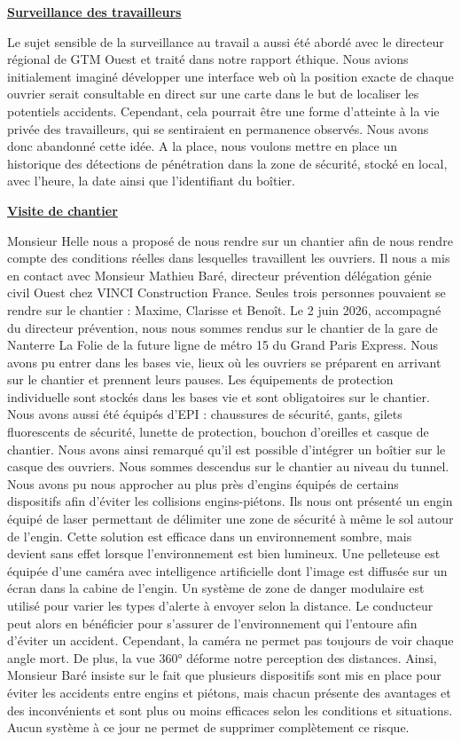 \bigskip

\uline{\textbf{Surveillance des travailleurs}}

Le sujet sensible de la surveillance au travail a aussi été abordé avec le directeur régional de GTM Ouest et traité dans notre rapport éthique. Nous avions initialement imaginé développer une interface web où la position exacte de chaque ouvrier serait consultable en direct sur une carte dans le but de localiser les potentiels accidents. Cependant, cela pourrait être une forme d'atteinte à la vie privée des travailleurs, qui se sentiraient en permanence observés. Nous avons donc abandonné cette idée. A la place, nous voulons mettre en place un historique des détections de pénétration dans la zone de sécurité, stocké en local, avec l'heure, la date ainsi que l'identifiant du boîtier.

\bigskip

\uline{\textbf{Visite de chantier}}

Monsieur Helle nous a proposé de nous rendre sur un chantier afin de nous rendre compte des conditions réelles dans lesquelles travaillent les ouvriers. Il nous a mis en contact avec Monsieur Mathieu Baré, directeur prévention délégation génie civil Ouest chez VINCI Construction France. Seules trois personnes pouvaient se rendre sur le chantier : Maxime, Clarisse et Benoît. Le 2 juin 2026, accompagné du directeur prévention, nous nous sommes rendus sur le chantier de la gare de Nanterre La Folie de la future ligne de métro 15 du Grand Paris Express.
Nous avons pu entrer dans les bases vie, lieux où les ouvriers se préparent en arrivant sur le chantier et prennent leurs pauses. Les équipements de protection individuelle sont stockés dans les bases vie et sont obligatoires sur le chantier. Nous avons aussi été équipés d'EPI : chaussures de sécurité, gants, gilets fluorescents de sécurité, lunette de protection, bouchon d'oreilles et casque de chantier. Nous avons ainsi remarqué qu'il est possible d'intégrer un boîtier sur le casque des ouvriers.
Nous sommes descendus sur le chantier au niveau du tunnel. Nous avons pu nous approcher au plus près d'engins équipés de certains dispositifs afin d'éviter les collisions engins-piétons. Ils nous ont présenté un engin équipé de laser permettant de délimiter une zone de sécurité à même le sol autour de l'engin. Cette solution est efficace dans un environnement sombre, mais devient sans effet lorsque l'environnement est bien lumineux. Une pelleteuse est équipée d'une caméra avec intelligence artificielle dont l'image est diffusée sur un écran dans la cabine de l'engin. Un système de zone de danger modulaire est utilisé pour varier les types d'alerte à envoyer selon la distance. Le conducteur peut alors en bénéficier pour s'assurer de l'environnement qui l'entoure afin d'éviter un accident. Cependant, la caméra ne permet pas toujours de voir chaque angle mort. De plus, la vue 360° déforme notre perception des distances. 
Ainsi, Monsieur Baré insiste sur le fait que plusieurs dispositifs sont mis en place pour éviter les accidents entre engins et piétons, mais chacun présente des avantages et des inconvénients et sont plus ou moins efficaces selon les conditions et situations. Aucun système à ce jour ne permet de supprimer complètement ce risque.

